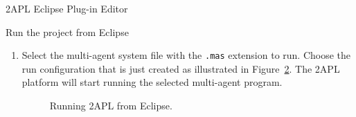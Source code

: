 \begin{chapter}{2APL Eclipse Plug-in Editor}
\begin{section}{Run the project from Eclipse}
\begin{enumerate}
\begin{enumerate}
        \item Working Directory: the path to the 2APL directory where {\tt 2apl.jar} is
        located\\
        (e.g. \texttt{D:$\backslash$apapl}).

        \item Arguments: \texttt{-jar 2apl.jar -nojade "\$\{project\_loc\}"}
        \end{enumerate}

        These steps are illustrated in Figure~\ref{fig:platform}.
        Note that the required paths are correctly entered. It is also important to note that
        the behavior of the run configuration can be modified by changing the
        Arguments. Add the option \texttt{-nogui} after \texttt{-nojade} to
        disable the 2APL GUI. Or leave the \texttt{-nojade} option out of the
        Arguments to get a choice to enable the jade platform.
        \begin{figure}[ht]
                \begin{center}
                \end{center}
                \caption{Creating a direct 2APL Run item in Eclipse.}\label{fig:platform}
            \end{figure}

    \item Select the multi-agent system file with the \texttt{.mas} extension to run.
    Choose the run configuration that is just created as illustrated in
    Figure~\ref{fig:run}. The 2APL platform will start running the selected multi-agent program.
        \begin{figure}[ht]
            \begin{center}
            \end{center}
            \caption{Running 2APL from Eclipse.}\label{fig:run}
        \end{figure}

    \end{enumerate}
\end{section}
\end{chapter}
